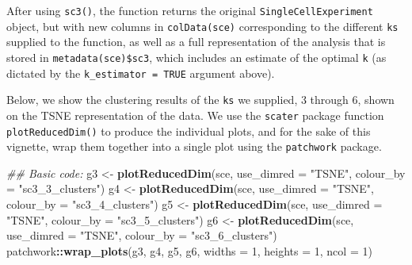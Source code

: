 \documentclass[]{book}
\newenvironment{Shaded}{\begin{snugshade}}{\end{snugshade}}
\newcommand{\CommentTok}[1]{\textcolor[rgb]{0.56,0.35,0.01}{\textit{#1}}}
\newcommand{\DataTypeTok}[1]{\textcolor[rgb]{0.13,0.29,0.53}{#1}}
\newcommand{\DecValTok}[1]{\textcolor[rgb]{0.00,0.00,0.81}{#1}}
\newcommand{\KeywordTok}[1]{\textcolor[rgb]{0.13,0.29,0.53}{\textbf{#1}}}
\newcommand{\NormalTok}[1]{#1}
\newcommand{\OperatorTok}[1]{\textcolor[rgb]{0.81,0.36,0.00}{\textbf{#1}}}
\newcommand{\OtherTok}[1]{\textcolor[rgb]{0.56,0.35,0.01}{#1}}
\newcommand{\StringTok}[1]{\textcolor[rgb]{0.31,0.60,0.02}{#1}}
\begin{document}
\begin{Shaded}
\end{Shaded}

After using \texttt{sc3()}, the function returns the original \texttt{SingleCellExperiment} object, but with new columns in \texttt{colData(sce)} corresponding to the different \texttt{ks} supplied to the function, as well as a full representation of the analysis that is stored in \texttt{metadata(sce)\$sc3}, which includes an estimate of the optimal \texttt{k} (as dictated by the \texttt{k\_estimator\ =\ TRUE} argument above).

Below, we show the clustering results of the \texttt{ks} we supplied, 3 through 6, shown on the TSNE representation of the data. We use the \texttt{scater} package function \texttt{plotReducedDim()} to produce the individual plots, and for the sake of this vignette, wrap them together into a single plot using the \texttt{patchwork} package.

\begin{Shaded}
\begin{Highlighting}[]
\CommentTok{## Basic code:}
\NormalTok{g3 <-}\StringTok{ }\KeywordTok{plotReducedDim}\NormalTok{(sce, }\DataTypeTok{use_dimred =} \StringTok{"TSNE"}\NormalTok{, }\DataTypeTok{colour_by =} \StringTok{"sc3_3_clusters"}\NormalTok{)}
\NormalTok{g4 <-}\StringTok{ }\KeywordTok{plotReducedDim}\NormalTok{(sce, }\DataTypeTok{use_dimred =} \StringTok{"TSNE"}\NormalTok{, }\DataTypeTok{colour_by =} \StringTok{"sc3_4_clusters"}\NormalTok{)}
\NormalTok{g5 <-}\StringTok{ }\KeywordTok{plotReducedDim}\NormalTok{(sce, }\DataTypeTok{use_dimred =} \StringTok{"TSNE"}\NormalTok{, }\DataTypeTok{colour_by =} \StringTok{"sc3_5_clusters"}\NormalTok{)}
\NormalTok{g6 <-}\StringTok{ }\KeywordTok{plotReducedDim}\NormalTok{(sce, }\DataTypeTok{use_dimred =} \StringTok{"TSNE"}\NormalTok{, }\DataTypeTok{colour_by =} \StringTok{"sc3_6_clusters"}\NormalTok{)}
\NormalTok{patchwork}\OperatorTok{::}\KeywordTok{wrap_plots}\NormalTok{(g3, g4, g5, g6, }\DataTypeTok{widths =} \DecValTok{1}\NormalTok{, }\DataTypeTok{heights =} \DecValTok{1}\NormalTok{, }\DataTypeTok{ncol =} \DecValTok{1}\NormalTok{)}
\end{Highlighting}
\end{Shaded}
\end{document}
